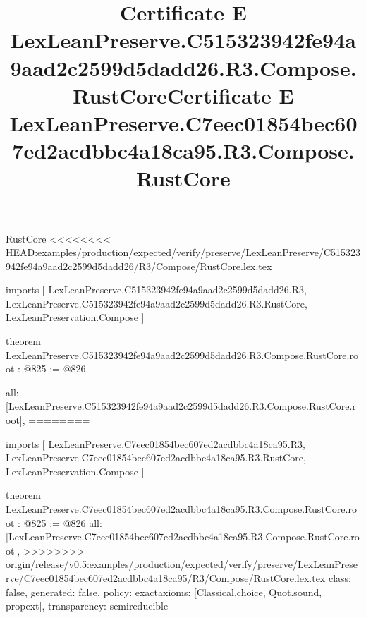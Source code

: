 \begin{lexlean}{RustCore}
<<<<<<<< HEAD:examples/production/expected/verify/preserve/LexLeanPreserve/C515323942fe94a9aad2c2599d5dadd26/R3/Compose/RustCore.lex.tex
\title{Certificate E LexLeanPreserve.C515323942fe94a9aad2c2599d5dadd26.R3.Compose.RustCore}
\begin{coremodule}
imports [
  LexLeanPreserve.C515323942fe94a9aad2c2599d5dadd26.R3,
  LexLeanPreserve.C515323942fe94a9aad2c2599d5dadd26.R3.RustCore,
  LexLeanPreservation.Compose
]

theorem LexLeanPreserve.C515323942fe94a9aad2c2599d5dadd26.R3.Compose.RustCore.root : @825 := @826 {
  all: [LexLeanPreserve.C515323942fe94a9aad2c2599d5dadd26.R3.Compose.RustCore.root],
========
\title{Certificate E LexLeanPreserve.C7eec01854bec607ed2acdbbc4a18ca95.R3.Compose.RustCore}
\begin{coremodule}
imports [
  LexLeanPreserve.C7eec01854bec607ed2acdbbc4a18ca95.R3,
  LexLeanPreserve.C7eec01854bec607ed2acdbbc4a18ca95.R3.RustCore,
  LexLeanPreservation.Compose
]

theorem LexLeanPreserve.C7eec01854bec607ed2acdbbc4a18ca95.R3.Compose.RustCore.root : @825 := @826 {
  all: [LexLeanPreserve.C7eec01854bec607ed2acdbbc4a18ca95.R3.Compose.RustCore.root],
>>>>>>>> origin/release/v0.5:examples/production/expected/verify/preserve/LexLeanPreserve/C7eec01854bec607ed2acdbbc4a18ca95/R3/Compose/RustCore.lex.tex
  class: false,
  generated: false,
  policy: exact{axioms: [Classical.choice, Quot.sound, propext]},
  transparency: semireducible
}


\end{coremodule}}
\end{coremodule}
\end{lexlean}
